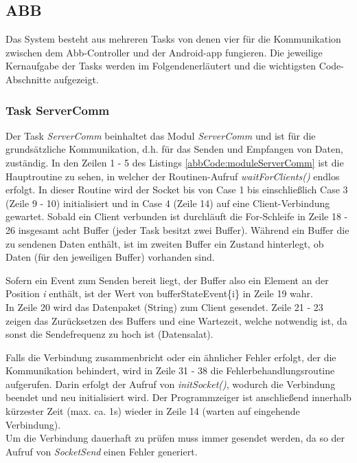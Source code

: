 \subsection{ABB}
\label{sec:ChapterABB}
Das System besteht aus mehreren Tasks von denen vier für die Kommunikation 
zwischen dem Abb-Controller und der Android-\gls{app} fungieren.
Die jeweilige Kernaufgabe der Tasks werden im Folgendenerläutert und die 
wichtigsten Code-Abschnitte aufgezeigt. 

\subsubsection{Task ServerComm}
Der Task \textit{ServerComm} beinhaltet das Modul \textit{ServerComm} und ist 
für die 
grundsätzliche Kommunikation, d.h. für 
das Senden und 
Empfangen von Daten, zuständig.
In den Zeilen 1 - 5 des Listings \ref{abbCode:moduleServerComm} ist die 
Hauptroutine zu sehen, in welcher der Routinen-Aufruf \textit{waitForClients()} 
endlos erfolgt.
In dieser Routine wird der Socket bis von Case 1 bis einschließlich Case 3 
(Zeile 9 - 10) initialisiert und in Case 4 (Zeile 14) auf eine 
Client-Verbindung gewartet. 
Sobald ein Client verbunden ist durchläuft die For-Schleife in Zeile 18 - 26 
insgesamt acht Buffer (jeder Task besitzt zwei Buffer). Während ein Buffer die 
zu sendenen Daten enthält, ist im zweiten Buffer ein Zustand hinterlegt, ob 
Daten (für den jeweiligen Buffer) vorhanden sind.

Sofern ein Event zum Senden bereit liegt, der Buffer also ein Element an der 
Position \textit{i} enthält, ist der Wert von bufferStateEvent\{i\} in Zeile 19 
wahr.\\
In Zeile 20 wird das Datenpaket (String) zum Client gesendet.
Zeile 21 - 23 zeigen das Zurücksetzen des Buffers und eine Wartezeit, welche 
notwendig ist, da sonst die Sendefrequenz zu hoch ist (Datensalat).

Falls die Verbindung zusammenbricht oder ein ähnlicher Fehler erfolgt, der die 
Kommunikation behindert, wird in Zeile 31 - 38 die Fehlerbehandlungsroutine 
aufgerufen. Darin erfolgt der Aufruf von \textit{initSocket()}, wodurch die 
Verbindung beendet und neu initialisiert wird. Der Programmzeiger ist 
anschließend innerhalb kürzester Zeit (max. ca. 1s) wieder in Zeile 14 (warten 
auf eingehende Verbindung).\\
Um die Verbindung dauerhaft zu prüfen muss immer gesendet werden, da so der 
Aufruf von \textit{SocketSend} einen Fehler generiert.


